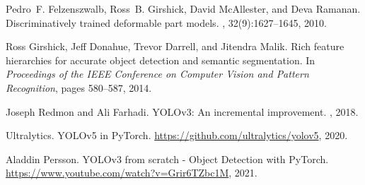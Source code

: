 \documentclass{article}
\begin{document}
\nocite{langley00}


\begin{thebibliography}{99}

Pedro~F. Felzenszwalb, Ross~B. Girshick, David McAllester, and Deva Ramanan.
\newblock Discriminatively trained deformable part models.
, 32(9):1627--1645, 2010.

Ross Girshick, Jeff Donahue, Trevor Darrell, and Jitendra Malik.
\newblock Rich feature hierarchies for accurate object detection and semantic segmentation.
\newblock In {\em Proceedings of the IEEE Conference on Computer Vision and Pattern Recognition}, pages 580--587, 2014.

Joseph Redmon and Ali Farhadi.
\newblock YOLOv3: An incremental improvement.
, 2018.

Ultralytics.
\newblock YOLOv5 in PyTorch.
\newblock \url{https://github.com/ultralytics/yolov5}, 2020.

Aladdin Persson.
\newblock YOLOv3 from scratch - Object Detection with PyTorch.
\newblock \url{https://www.youtube.com/watch?v=Grir6TZbc1M}, 2021.

\end{thebibliography}
\end{document}

